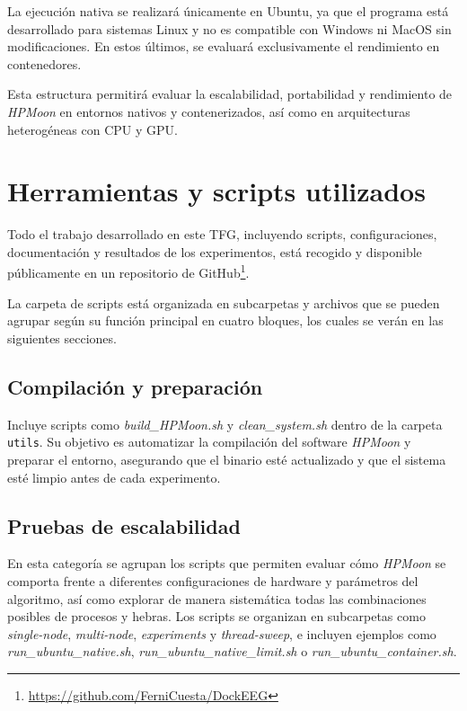 La ejecución nativa se realizará únicamente en Ubuntu, ya que el programa está desarrollado para sistemas Linux y no es compatible con Windows ni MacOS sin modificaciones. En estos últimos, se evaluará exclusivamente el rendimiento en contenedores.

Esta estructura permitirá evaluar la escalabilidad, portabilidad y rendimiento de \textit{HPMoon} en entornos nativos y contenerizados, así como en arquitecturas heterogéneas con CPU y GPU.

\section{Herramientas y scripts utilizados}\label{sec:herramientas_scripts}

Todo el trabajo desarrollado en este TFG, incluyendo scripts, configuraciones, documentación y resultados de los experimentos, está recogido y disponible públicamente en un repositorio de GitHub\footnote{\url{https://github.com/FerniCuesta/DockEEG}}.

La carpeta de scripts está organizada en subcarpetas y archivos que se pueden agrupar según su función principal en cuatro bloques, los cuales se verán en las siguientes secciones.

\subsection{Compilación y preparación}
Incluye scripts como \textit{build\_HPMoon.sh} y \textit{clean\_system.sh} dentro de la carpeta \texttt{utils}. Su objetivo es automatizar la compilación del software \textit{HPMoon} y preparar el entorno, asegurando que el binario esté actualizado y que el sistema esté limpio antes de cada experimento.

\subsection{Pruebas de escalabilidad}

En esta categoría se agrupan los scripts que permiten evaluar cómo \textit{HPMoon} se comporta frente a diferentes configuraciones de hardware y parámetros del algoritmo, así como explorar de manera sistemática todas las combinaciones posibles de procesos y hebras. Los scripts se organizan en subcarpetas como \textit{single-node}, \textit{multi-node}, \textit{experiments} y \textit{thread-sweep}, e incluyen ejemplos como \textit{run\_ubuntu\_native.sh}, \textit{run\_ubuntu\_native\_limit.sh} o \textit{run\_ubuntu\_container.sh}.

